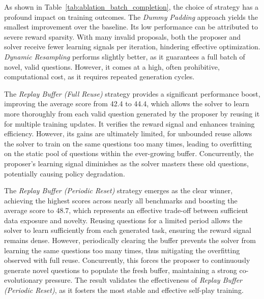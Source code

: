 \documentclass[10pt, a4paper, logo]{googledeepmind} %
\begin{document}
As shown in Table~\ref{tab:ablation_batch_completion}, the choice of strategy has a profound impact on training outcomes. The \textit{Dummy Padding} approach yields the smallest improvement over the baseline. Its low performance can be attributed to severe reward sparsity. With many invalid proposals, both the proposer and solver receive fewer learning signals per iteration, hindering effective optimization. \textit{Dynamic Resampling} performs slightly better, as it guarantees a full batch of novel, valid questions. However, it comes at a high, often prohibitive, computational cost, as it requires repeated generation cycles.

The \textit{Replay Buffer (Full Reuse)} strategy provides a significant performance boost, improving the average score from 42.4 to 44.4, which allows the solver to learn more thoroughly from each valid question generated by the proposer by reusing it for multiple training updates. It verifies the reward signal and enhances training efficiency. However, its gains are ultimately limited, for unbounded reuse allows the solver to train on the same questions too many times, leading to overfitting on the static pool of questions within the ever-growing buffer. Concurrently, the proposer's learning signal diminishes as the solver masters these old questions, potentially causing policy degradation.

The \textit{Replay Buffer (Periodic Reset)} strategy emerges as the clear winner, achieving the highest scores across nearly all benchmarks and boosting the average score to 48.7, which represents an effective trade-off between sufficient data exposure and novelty. Reusing questions for a limited period allows the solver to learn sufficiently from each generated task, ensuring the reward signal remains dense. However, periodically clearing the buffer prevents the solver from learning the same questions too many times, thus mitigating the overfitting observed with full reuse. Concurrently, this forces the proposer to continuously generate novel questions to populate the fresh buffer, maintaining a strong co-evolutionary pressure. The result validates the effectiveness of \textit{Replay Buffer (Periodic Reset)}, as it fosters the most stable and effective self-play training.
\end{document}
